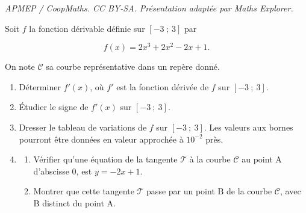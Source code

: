 \documentclass[10pt]{article}
\begin{document}
\noindent\textit{APMEP / CoopMaths. CC BY-SA. Présentation adaptée par Maths Explorer.}\par\medskip
\medskip


Soit $f$ la fonction dérivable définie sur $[-3~;~3]$ par 

\[f(x) = 2x^3 + 2x^2 - 2x + 1.\]

On note $\mathcal{C}$ sa courbe représentative dans un repère donné.

\medskip

\begin{enumerate}
\item Déterminer $f'(x)$, où $f'$ est la fonction dérivée de $f$ sur $[-3~;~3]$.
\item Étudier le signe de $f'(x)$ sur $[-3~;~3]$.
\item Dresser le tableau de variations de $f$ sur $[-3~;~3]$. Les valeurs aux bornes pourront être
données en valeur approchée à $10^{-2}$ près.
\item 
	\begin{enumerate}
		\item  Vérifier qu'une équation de la tangente $\mathcal{T}$ à la courbe $\mathcal{C}$ au point A d'abscisse 0, est $y = -2x + 1$.
		\item Montrer que cette tangente $\mathcal{T}$ passe par un point B de la courbe $\mathcal{C}$, avec B distinct du point A.
	\end{enumerate}
\end{enumerate}
\end{document}

